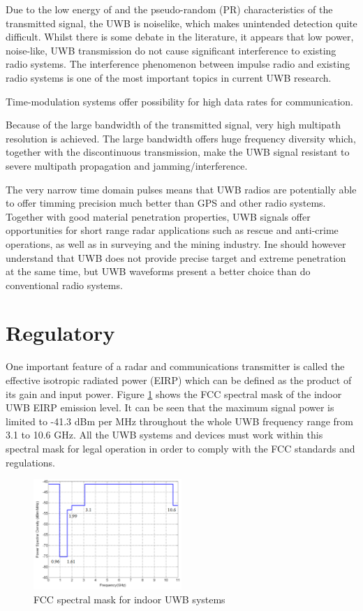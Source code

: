 \documentclass[\main/main.tex]{subfiles}
\begin{document}
Due to the low energy of and the pseudo-random (PR) characteristics of the transmitted signal, the UWB is noiselike, which makes unintended detection quite difficult. Whilst there is some debate in the literature, it appears that low power, noise-like, UWB transmission do not cause significant interference to existing radio systems. The interference phenomenon between impulse radio and existing radio systems is one of the most important topics in current UWB research.

Time-modulation systems offer possibility for high data rates for communication. 

Because of the large bandwidth of the transmitted signal, very high multipath resolution is achieved. The large bandwidth offers huge frequency diversity which, together with the discontinuous transmission, make the UWB signal resistant to severe multipath propagation and jamming/interference. 

The very narrow time domain pulses means that UWB radios are potentially able to offer timming precision much better than GPS and other radio systems. Together with good material penetration properties, UWB signals offer opportunities for short range radar applications such as rescue and anti-crime operations, as well as in surveying and the mining industry. Ine should however understand that UWB does not provide precise target and extreme penetration at the same time, but UWB waveforms present a better choice than do conventional radio systems.

\section{Regulatory}

One important feature of a radar and communications transmitter is called the effective isotropic radiated power (EIRP) which can be defined as the product of its gain and input power. Figure \ref{fig:fcc_spectral_mask_for_indoor_uwb_systems} shows the FCC spectral mask of the indoor UWB EIRP emission level. It can be seen that the maximum signal power is limited to -41.3 dBm per MHz throughout the whole UWB frequency range from 3.1 to 10.6 GHz. All the UWB systems and devices must work within this spectral mask for legal operation in order to comply with the FCC standards and regulations.

\begin{figure}[H]
    \centering
    \includegraphics[width=0.5\textwidth]{fcc_spectral_mask_for_indoor_uwb_systems}
    \caption{FCC spectral mask for indoor UWB systems}
    \label{fig:fcc_spectral_mask_for_indoor_uwb_systems}
\end{figure}
\end{document}
